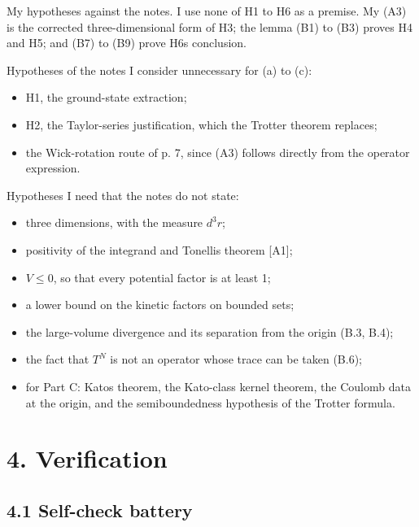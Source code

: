 \documentclass[11pt,a4paper]{article}
\providecommand{\tightlist}{\setlength{\itemsep}{0pt}\setlength{\parskip}{0pt}}
\begin{document}
My hypotheses against the notes\textquotesingle. I use none of H1 to H6 as a premise. My (A3) is the corrected three-dimensional form of H3; the lemma (B1) to (B3) proves H4 and H5; and (B7) to (B9) prove H6\textquotesingle s conclusion.

Hypotheses of the notes I consider unnecessary for (a) to (c):

\begin{itemize}
\tightlist
\item
  H1, the ground-state extraction;
\item
  H2, the Taylor-series justification, which the Trotter theorem replaces;
\item
  the Wick-rotation route of p. 7, since (A3) follows directly from the operator expression.
\end{itemize}

Hypotheses I need that the notes do not state:

\begin{itemize}
\tightlist
\item
  three dimensions, with the measure \(d^3r\);
\item
  positivity of the integrand and Tonelli\textquotesingle s theorem {[}A1{]};
\item
  \(V\le0\), so that every potential factor is at least 1;
\item
  a lower bound on the kinetic factors on bounded sets;
\item
  the large-volume divergence and its separation from the origin (B.3, B.4);
\item
  the fact that \(T^N\) is not an operator whose trace can be taken (B.6);
\item
  for Part C: Kato\textquotesingle s theorem, the Kato-class kernel theorem, the Coulomb data at the origin, and the semiboundedness hypothesis of the Trotter formula.
\end{itemize}

\hypertarget{verification}{%
\section{4. Verification}\label{verification}}

\hypertarget{self-check-battery}{%
\subsection{4.1 Self-check battery}\label{self-check-battery}}
\end{document}
